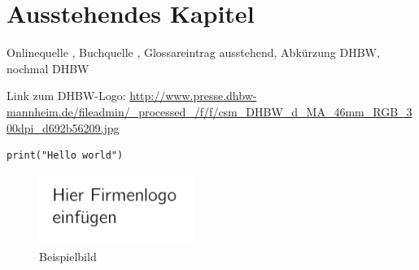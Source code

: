 \section{Ausstehendes Kapitel}

Onlinequelle \cite{OnlineKey}, Buchquelle \cite[S.~1]{BookKey}, Glossareintrag \gls{ausstehend}, Abkürzung \ac{DHBW}, nochmal \ac{DHBW}

Link zum DHBW-Logo: \url{http://www.presse.dhbw-mannheim.de/fileadmin/_processed_/f/f/csm_DHBW_d_MA_46mm_RGB_300dpi_d692b56209.jpg}

\begin{lstlisting}
print("Hello world")
\end{lstlisting}

\begin{figure}
    \caption{Beispielbild}
    \includegraphics[width=5cm]{bilder/logo.png}
\end{figure}
